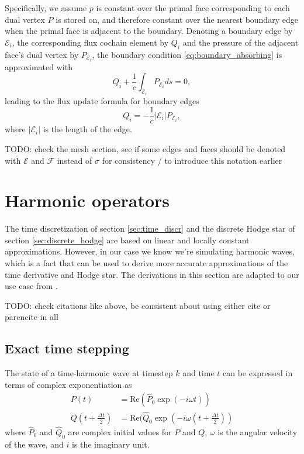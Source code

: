 \documentclass[utf8,english]{gradu3}
\begin{document}
Specifically, we assume $p$ is constant over the primal face corresponding
to each dual vertex $P$ is stored on,
and therefore constant over the nearest boundary edge
when the primal face is adjacent to the boundary.
Denoting a boundary edge by $\mathcal{E}_i$,
the corresponding flux cochain element by $Q_i$
and the pressure of the adjacent face's dual vertex by $P_{\mathcal{E}_i}$,
the boundary condition \eqref{eq:boundary_absorbing} is approximated with
\[
  Q_i + \frac{1}{c} \int_{\mathcal{E}_i} P_{\mathcal{E}_i} ds = 0,
\]
leading to the flux update formula for boundary edges
\begin{equation}
  Q_i = -\frac{1}{c} |\mathcal{E}_i| P_{\mathcal{E}_i},
\end{equation}
where $|\mathcal{E}_i|$ is the length of the edge.

TODO: check the mesh section, see if some edges and faces
should be denoted with $\mathcal{E}$ and $\mathcal{F}$ instead of $\sigma$
for consistency / to introduce this notation earlier

\section{Harmonic operators}\label{sec:harmonic_operators}

The time discretization of section \ref{sec:time_discr}
and the discrete Hodge star of section \ref{sec:discrete_hodge}
are based on linear and locally constant approximations.
However, in our case we know we're simulating harmonic waves,
which is a fact that can be used to derive more accurate approximations
of the time derivative and Hodge star.
The derivations in this section are adapted to our use case
from \parencite{rabina_numerical_2014}.

TODO: check citations like above, be consistent about using
either cite or parencite in all

\subsection{Exact time stepping}

The state of a time-harmonic wave at timestep $k$ and time $t$
can be expressed in terms of complex exponentiation as
\begin{align}
\label{eq:harmonic_pressure}
P(t) &= \text{Re}(\hat{P}_0 \exp(-i\omega t)) \\
\label{eq:harmonic_flux}
Q(t + \frac{\Delta t}{2}) &= \text{Re}(\hat{Q}_0 \exp(-i\omega (t + \frac{\Delta t}{2}))
\end{align}
where $\hat{P}_0$ and $\hat{Q}_0$ are complex initial values for $P$ and $Q$,
$\omega$ is the angular velocity of the wave, and $i$ is the imaginary unit.
\end{document}
